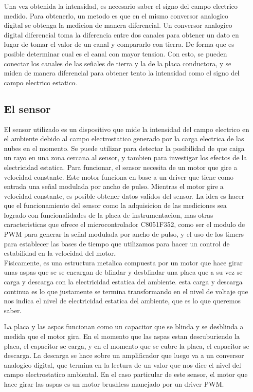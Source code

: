 Una vez obtenida la intensidad, es necesario saber el signo del campo electrico medido. Para obtenerlo, un metodo es que en el mismo conversor analogico digital se obtenga la medicion de manera diferencial. Un conversor analogico digital diferencial toma la diferencia entre dos canales para obtener un dato en lugar de tomar el valor de un canal y compararlo con tierra. De forma que es posible determinar cual es el canal con mayor tension. Con esto, se pueden conectar los canales de las señales de tierra y la de la placa conductora, y se miden de manera diferencial para obtener tento la intensidad como el signo del campo electrico estatico.
\cite{sensorcampo}

\subsection{El sensor} %
\label{sub:el_sensor}

El sensor utilizado es un dispositivo que mide la intensidad del campo electrico en el ambiente debido al campo electrostatico generado por la carga electrica de las nubes en el momento. Se puede utilizar para detectar la posibilidad de que caiga un rayo en una zona cercana al sensor, y tambien para investigar los efectos de la electricidad estatica. Para funcionar, el sensor necesita de un motor que gire a velocidad constante. Este motor funciona en base a un driver que tiene como entrada una señal modulada por ancho de pulso.
Mientras el motor gire a velocidad constante, es posible obtener datos validos del sensor. La idea es hacer que el funcionamiento del sensor como la adquisicion de las mediciones sea logrado con funcionalidades de la placa de instrumentacion, mas otras caracteristicas que ofrece el microcontrolador C8051F352, como ser el modulo de PWM para generar la señal modulada por ancho de pulso, y el uso de los timers para establecer las bases de tiempo que utilizamos para hacer un control de estabilidad en la velocidad del motor. \\

Fisicamente, es una estructura metalica compuesta por un motor que hace girar unas aspas que se se encargan de blindar y desblindar una placa que a su vez se carga y descarga con la electricidad estatica del ambiente. esta carga y descarga continua es lo que justamente se termina transformando en el nivel de voltaje que nos indica el nivel de electricidad estatica del ambiente, que es lo que queremos saber.

La placa y las aspas funcionan como un capacitor que se blinda y se des\-blinda a medida que el motor gira. En el momento que las aspas estan descuburiendo la placa, el capacitor se carga, y en el momento que se cubre la placa, el capacitor se descarga. La descarga se hace sobre un amplificador que luego va a un conversor analogico digital, que termina en la lectura de un valor que nos dice el nivel del campo electrostatico ambiental. En el caso particular de este sensor, el motor que hace girar las aspas es un motor brushless manejado por un driver PWM.

